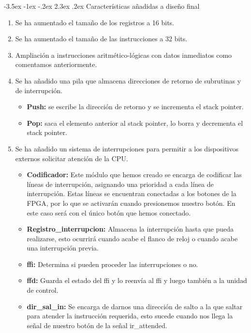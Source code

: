 \documentclass[11pt]{report}
\makeatletter
\renewcommand\chapter{\@startsection{chapter}{0}{\z@}%
    {-3.5ex \@plus -1ex \@minus -.2ex}%
    {2.3ex \@plus.2ex}%
    {\normalfont\Large\bfseries}}
\makeatother
\begin{document}
\newpage

\chapter{Características añadidas a diseño final}
\begin{enumerate}
  \item Se ha aumentado el tamaño de los registros a 16 bits.
  \item Se ha aumentado el tamaño de las instrucciones a 32 bits.
  \item Ampliación a instrucciones aritmético-lógicas con datos inmediatos como comentamos anteriormente.
  \item Se ha añadido una pila que almacena direcciones de retorno de subrutinas y de interrupción.
        \begin{itemize}
          \item \textbf{Push:} se escribe la dirección de retorno y se incrementa el stack pointer.
          \item \textbf{Pop:} saca el elemento anterior al stack pointer, lo borra y decrementa el stack pointer.
        \end{itemize}
  \item Se ha añadido un sistema de interrupciones para permitir a los dispositivos externos solicitar atención de la CPU.
        \begin{itemize}
          \item \textbf{Codificador:} Este módulo que hemos creado se encarga de codificar las líneas de interrupción, asignando una prioridad a cada línea de interrupción. Estas líneas se encuentran conectadas a los botones de la FPGA, por lo que se activarán cuando presionemos nuestro botón. En este caso será con el único botón que hemos conectado.
          \item \textbf{Registro\_interrupcion: } Almacena la interrupción hasta que pueda realizarse, esto ocurrirá cuando acabe el flanco de reloj o cuando acabe una interrupción previa.
          \item \textbf{ffi:} Determina si pueden proceder las interrupciones o no.
          \item \textbf{ffd:} Guarda el estado del ffi y lo reenvía al ffi y luego también a la unidad de control.
          \item \textbf{dir\_sal\_in:} Se encarga de darnos una dirección de salto a la que saltar para atender la instrucción requerida, esto sucede cuando nos llega la señal de nuestro botón de la señal ir\_attended.

\end{itemize}
\end{enumerate}
\end{document}
